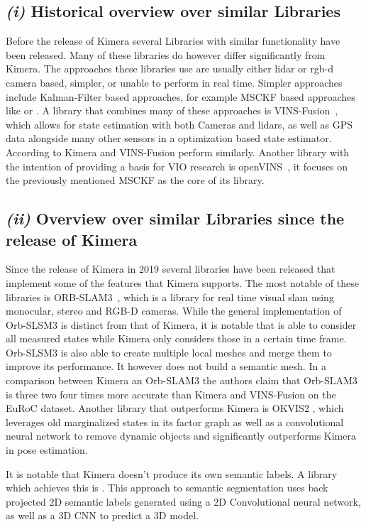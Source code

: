 \documentclass[11pt,a4paper]{article}
\begin{document}
\subsection*{\emph{(i)} Historical overview over similar Libraries}
Before the release of Kimera several Libraries with similar functionality have been released. 
Many of these libraries do however differ significantly from Kimera.
The approaches these libraries use are usually either lidar or rgb-d camera based, simpler, or unable to perform in real time. 
Simpler approaches include Kalman-Filter based approaches, for example MSCKF based approaches like 
\cite{MSCKF} or \cite{sun2018robust}. 
A library that combines many of these approaches is VINS-Fusion~\cite{qin2019b}, which allows for state estimation with both Cameras and lidars, as well as GPS data alongside many other sensors in a optimization based state estimator. 
According to \cite{ORBSLAM3} Kimera and VINS-Fusion perform similarly.
Another library with the intention of providing a basis for VIO research is openVINS~\cite{Geneva2020ICRA}, it focuses on the previously mentioned MSCKF as the core of its library. 

\subsection*{\emph{(ii)} Overview over similar Libraries since the release of Kimera}
Since the release of Kimera in 2019 several libraries have been released that implement some of the features that Kimera supports.
The most notable of these libraries is ORB-SLAM3~\cite{ORBSLAM3}, which is a library for real time visual slam using monocular, stereo and RGB-D cameras. 
While the general implementation of Orb-SLSM3 is distinct from that of Kimera, it is notable that is able to consider all measured states while Kimera only considers those in a certain time frame. 
Orb-SLSM3 is also able to create multiple local meshes and merge them to improve its performance.
It however does not build a semantic mesh. 
In a comparison between Kimera an Orb-SLAM3 the authors claim that Orb-SLAM3 is three two four times more accurate than Kimera and VINS-Fusion on the EuRoC dataset. 
Another library that outperforms Kimera is OKVIS2 \cite{leutenegger2022okvis2}, which leverages old marginalized states in its factor graph as well as a convolutional neural network to remove dynamic objects and significantly outperforms Kimera in pose estimation. 

It is notable that Kimera doesn't produce its own semantic labels. 
A library which achieves this is \cite{murez2020atlas}.
This approach to semantic segmentation uses back projected 2D semantic labels generated using a 2D Convolutional neural network, as well as a 3D CNN to predict a 3D model. 
\end{document}
